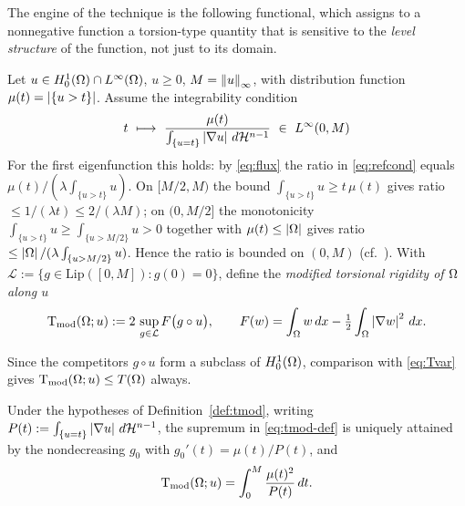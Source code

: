 The engine of the technique is the following functional, which assigns to a
nonnegative function a torsion-type quantity that is sensitive to the
\emph{level structure} of the function, not just to its domain.

\begin{definition}\label{def:tmod}
Let $u\in H^1_0(\Omega)\cap L^\infty(\Omega)$, $u\ge0$, $M=\left\|u\right\|_\infty$, with
distribution function $\mu(t)=\left|\{u>t\}\right|$. Assume the integrability
condition
\begin{equation}\label{eq:refcond}
  t\ \longmapsto\ \frac{\mu(t)}{\int_{\{u=t\}}\abs{\nabla u}\dH}\ \in\ L^\infty(0,M)
\end{equation}
For the first eigenfunction this holds: by \eqref{eq:flux} the ratio in
\eqref{eq:refcond} equals $\mu(t)/(\lambda\int_{\{u>t\}}u)$. On $[M/2,M)$ the
bound $\int_{\{u>t\}}u\ge t\,\mu(t)$ gives ratio $\le 1/(\lambda t)\le
2/(\lambda M)$; on $(0,M/2]$ the monotonicity $\int_{\{u>t\}}u\ge
\int_{\{u>M/2\}}u>0$ together with $\mu(t)\le\left|\Omega\right|$ gives ratio $\le
\left|\Omega\right|/(\lambda\int_{\{u>M/2\}}u)$. Hence the ratio is bounded on $(0,M)$
(cf.~\cite[Lem.~3.2]{Brasco2014}). With
$\mathcal L:=\{g\in\mathrm{Lip}([0,M]):g(0)=0\}$, define the
\emph{modified torsional rigidity of $\Omega$ along $u$}
\begin{equation}\label{eq:tmod-def}
  \operatorname{T_{\mathrm{mod}}}(\Omega;u):=2\,\sup_{g\in\mathcal L}F\bigl(g\circ u\bigr),
  \qquad F(w)=\int_\Omega w\,dx-\tfrac12\int_\Omega\left|\nabla w\right|^2\,dx .
\end{equation}
\end{definition}

Since the competitors $g\circ u$ form a subclass of $H^1_0(\Omega)$, comparison
with \eqref{eq:Tvar} gives $\operatorname{T_{\mathrm{mod}}}(\Omega;u)\le T(\Omega)$ always.

\begin{lemma}\label{lem:tmod-formula}
Under the hypotheses of Definition~\ref{def:tmod}, writing
$P(t):=\int_{\{u=t\}}\left|\nabla u\right|\,d\mathcal H^{n-1}$, the supremum in
\eqref{eq:tmod-def} is uniquely attained by the nondecreasing $g_0$ with
$g_0'(t)=\mu(t)/P(t)$, and
\begin{equation}\label{eq:tmod-formula}
  \operatorname{T_{\mathrm{mod}}}(\Omega;u)=\int_0^M\frac{\mu(t)^2}{P(t)}\,dt .
\end{equation}
\end{lemma}

